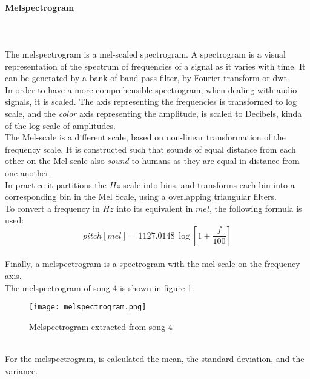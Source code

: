 \paragraph{Melspectrogram}
\mbox{} \\ \\
The melspectrogram is a mel-scaled spectrogram. A spectrogram is a visual representation of the spectrum of frequencies of a signal as it varies with time. It can be generated by a bank of band-pass filter, by Fourier transform or \gls{dwt}.
\\ \indent
In order to have a more comprehensible spectrogram, when dealing with audio signals, it is scaled. The axis representing the frequencies is transformed to log scale, and the \textit{color} axis representing the amplitude, is scaled to Decibels, kinda of the log scale of amplitudes.
\\ \indent
The Mel-scale is a different scale, based on non-linear transformation of the frequency scale. It is constructed such that sounds of equal distance from each other on the Mel-scale also \textit{sound} to humans as they are equal in distance from one another.
\\
In practice it partitions the $Hz$ scale into bins, and transforms each bin into a corresponding bin in the Mel Scale, using a overlapping triangular filters.
\\
To convert a frequency in $Hz$ into its equivalent in $mel$, the following formula is used:
\begin{equation}
	pitch[mel]=1127.0148\:\log \left[ {1+\dfrac{f}{100}} \right]
\end{equation}
\\
Finally, a melspectrogram is a spectrogram with the mel-scale on the frequency axis.
\\
The melspectrogram of song 4 is shown in figure \ref{fig:melspectrogram}.
\begin{figure}[h]
    \centering
    \texttt{[image: melspectrogram.png]} 
	\caption{Melspectrogram extracted from song 4}
    \label{fig:melspectrogram}
\end{figure}
\\
For the melspectrogram, is calculated the mean, the standard deviation, and the variance.

